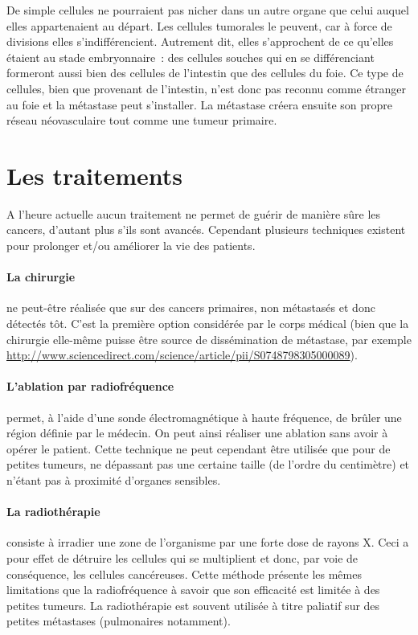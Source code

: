 \documentclass[main.tex]{subfiles}
\begin{document}
De simple cellules ne pourraient pas nicher dans un autre organe que celui auquel elles appartenaient au départ. Les cellules tumorales le peuvent, car à force de divisions elles s'indifférencient. Autrement dit, elles s'approchent de ce qu'elles étaient au stade embryonnaire~: des cellules souches qui en se différenciant formeront aussi bien des cellules de l'intestin que des cellules du foie. Ce type de cellules, bien que provenant de l'intestin, n'est donc pas reconnu comme étranger au foie et la métastase peut s'installer. La métastase créera ensuite son propre réseau néovasculaire tout comme une tumeur primaire.

\section{Les traitements}
A l'heure actuelle aucun traitement ne permet de guérir de manière sûre les cancers, d'autant plus s'ils sont avancés.  Cependant plusieurs techniques existent pour prolonger et/ou améliorer la vie des patients.
\paragraph{La chirurgie} ne peut-être réalisée que sur des cancers primaires, non métastasés et donc détectés tôt. C'est la première option considérée par le corps médical (bien que la chirurgie elle-même puisse être source de dissémination de métastase, \cf par exemple  \url{http://www.sciencedirect.com/science/article/pii/S0748798305000089}).

\paragraph{L'ablation par radiofréquence} permet, à l'aide d'une sonde électromagnétique à haute fréquence, de brûler une région définie par le médecin. On peut ainsi réaliser une ablation sans avoir à opérer le patient. Cette technique  
ne peut cependant être utilisée que pour de petites tumeurs, ne dépassant pas une certaine taille (de l'ordre du centimètre) et n'étant pas à proximité d'organes sensibles. 

\paragraph{La radiothérapie} consiste à irradier une zone de l'organisme par une forte dose de rayons X. Ceci a pour effet de détruire les cellules qui se multiplient  et donc, par voie de conséquence, les cellules cancéreuses. Cette méthode présente les mêmes limitations que la radiofréquence à savoir que son efficacité est limitée à des petites tumeurs. La radiothérapie est souvent utilisée à titre paliatif sur des petites métastases (pulmonaires notamment).
\end{document}
